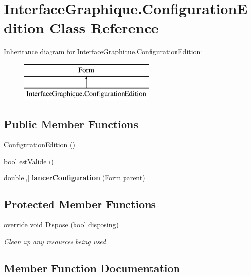 \hypertarget{class_interface_graphique_1_1_configuration_edition}{}\section{Interface\+Graphique.\+Configuration\+Edition Class Reference}
\label{class_interface_graphique_1_1_configuration_edition}
Inheritance diagram for Interface\+Graphique.\+Configuration\+Edition\+:\begin{figure}[H]
\begin{center}
\leavevmode
\includegraphics[height=2.000000cm]{class_interface_graphique_1_1_configuration_edition}
\end{center}
\end{figure}
\subsection*{Public Member Functions}
\begin{DoxyCompactItemize}
\item 
\hyperlink{group__inf2990_gafaa6fe8375c131a73859fe5e55f2c7c1}{Configuration\+Edition} ()
\item 
bool \hyperlink{group__inf2990_ga61bf31a8ba771a01a764748deade7f2d}{est\+Valide} ()
\item 
double\mbox{[},\mbox{]} {\bfseries lancer\+Configuration} (Form parent)
\end{DoxyCompactItemize}
\subsection*{Protected Member Functions}
\begin{DoxyCompactItemize}
\item 
override void \hyperlink{class_interface_graphique_1_1_configuration_edition_aebfc9dd762a317c3a6abf80c7398b1ce}{Dispose} (bool disposing)
\begin{DoxyCompactList}\small\item\em Clean up any resources being used. \end{DoxyCompactList}\end{DoxyCompactItemize}


\subsection{Member Function Documentation}
